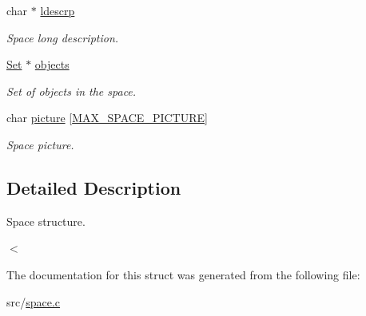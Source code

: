 \begin{DoxyCompactItemize}
char $\ast$ \hyperlink{struct__Space_adec57201467259116cb2a27a3ee8d214}{ldescrp}
\begin{DoxyCompactList}\small\item\em Space long description. \end{DoxyCompactList}\item 
\mbox{\label{struct__Space_a661ed8b0fc8085b6db70188aa5085625}} 
\hyperlink{set_8h_a6d3b7f7c92cbb4577ef3ef7ddbf93161}{Set} $\ast$ \hyperlink{struct__Space_a661ed8b0fc8085b6db70188aa5085625}{objects}
\begin{DoxyCompactList}\small\item\em Set of objects in the space. \end{DoxyCompactList}\item 
\mbox{\label{struct__Space_adfb0c2325d408d79fd790d7c3ca3228e}} 
char \hyperlink{struct__Space_adfb0c2325d408d79fd790d7c3ca3228e}{picture} \mbox{[}\hyperlink{space_8h_a81ff4df6e3833e5b8f8bd6255f4e3df6}{M\+A\+X\+\_\+\+S\+P\+A\+C\+E\+\_\+\+P\+I\+C\+T\+U\+RE}\mbox{]}
\begin{DoxyCompactList}\small\item\em Space picture. \end{DoxyCompactList}\end{DoxyCompactItemize}


\subsection{Detailed Description}
Space structure. 

$<$ 

The documentation for this struct was generated from the following file\+:\begin{DoxyCompactItemize}
\item 
src/\hyperlink{space_8c}{space.\+c}\end{DoxyCompactItemize}
